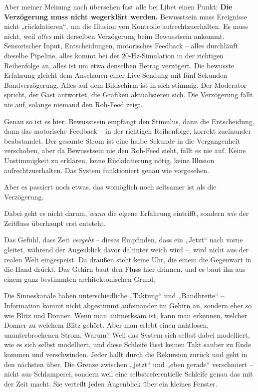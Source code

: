 \documentclass[11pt, twoside, openright]{book}
\begin{document}
Aber meiner Meinung nach übersehen fast alle bei Libet einen Punkt: \textbf{Die Verzögerung muss nicht wegerklärt werden.} Bewusstsein muss Ereignisse nicht „rückdatieren“, um die Illusion von Kontrolle aufrechtzuerhalten. Es muss nicht, weil \textit{alles} mit derselben Verzögerung beim Bewusstsein ankommt. Sensorischer Input, Entscheidungen, motorisches Feedback -- alles durchläuft dieselbe Pipeline, alles kommt bei der 20-Hz-Simulation in der richtigen Reihenfolge an, alles ist um etwa denselben Betrag verzögert. Die bewusste Erfahrung gleicht dem Anschauen einer Live-Sendung mit fünf Sekunden Bandverzögerung. Alles auf dem Bildschirm ist in sich stimmig. Der Moderator spricht, der Gast antwortet, die Grafiken aktualisieren sich. Die Verzögerung fällt nie auf, solange niemand den Roh-Feed zeigt.

Genau so ist es hier. Bewusstsein empfängt den Stimulus, dann die Entscheidung, dann das motorische Feedback -- in der richtigen Reihenfolge, korrekt zueinander beabstandet. Der gesamte Strom ist eine halbe Sekunde in die Vergangenheit verschoben, aber da Bewusstsein nie den Roh-Feed sieht, fällt es nie auf. Keine Unstimmigkeit zu erklären, keine Rückdatierung nötig, keine Illusion aufrechtzuerhalten. Das System funktioniert genau wie vorgesehen.

Aber es passiert noch etwas, das womöglich noch seltsamer ist als die Verzögerung.

Dabei geht es nicht darum, \textit{wann} die eigene Erfahrung eintrifft, sondern \textit{wie} der Zeitfluss überhaupt erst entsteht.

Das Gefühl, dass Zeit \textit{vergeht} -- dieses Empfinden, dass ein „Jetzt“ nach vorne gleitet, während der Augenblick davor dahinter weich wird --, wird nicht aus der realen Welt eingespeist. Da draußen steht keine Uhr, die einem die Gegenwart in die Hand drückt. Das Gehirn baut den Fluss hier drinnen, und es baut ihn aus einem ganz bestimmten architektonischen Grund.

Die Sinneskanäle haben unterschiedliche „Taktung“ und „Bandbreite“ -- Information kommt nicht abgestimmt aufeinander im Gehirn an, sondern eher so wie Blitz und Donner. Wenn man aufmerksam ist, kann man erkennen, welcher Donner zu welchem Blitz gehört. Aber man erlebt einen nahtlosen, ununterbrochenen Strom. Warum? Weil das System sich selbst dabei modelliert, wie es sich selbst modelliert, und diese Schleife lässt keinen Takt sauber zu Ende kommen und verschwinden. Jeder hallt durch die Rekursion zurück und geht in den nächsten über. Die Grenze zwischen „jetzt“ und „eben gerade“ verschmiert -- nicht aus Schlamperei, sondern weil eine selbstreferentielle Schleife genau das mit der Zeit macht. Sie verteilt jeden Augenblick über ein kleines Fenster.
\end{document}
